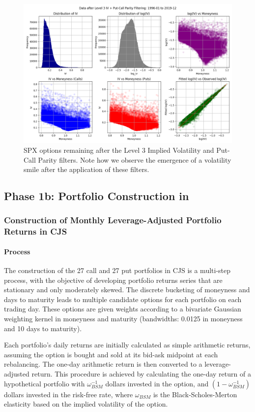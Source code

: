 \documentclass[11pt]{article}
\begin{document}
\begin{figure}[H]
  \centering
  \includegraphics[width=\linewidth,height=0.666\linewidth]{../docs_src/L3_IV_PCP_1996-01_2019-12_iv.png}
  \caption{SPX options remaining after the Level 3 Implied Volatility and Put-Call Parity filters. Note how we observe the emergence of a volatility smile after the application of these filters.}
  \label{fig:l3_iv_pcp_spx_options_data}
\end{figure}


\subsection{Phase 1b: Portfolio Construction in \citet{Constantinides2013}}
\subsubsection{Construction of Monthly Leverage-Adjusted Portfolio Returns in CJS}

\paragraph{Process}
The construction of the 27 call and 27 put portfolios in CJS is a multi-step process, with the objective of developing portfolio returns series that are stationary and only moderately skewed. The discrete bucketing of moneyness and days to maturity leads to multiple candidate options for each portfolio on each trading day. These options are given weights according to a bivariate Gaussian weighting kernel in moneyness and maturity (bandwidths: 0.0125 in moneyness and 10 days to maturity).

Each portfolio's daily returns are initially calculated as simple arithmetic returns, assuming the option is bought and sold at its bid-ask midpoint at each rebalancing. The one-day arithmetic return is then converted to a leverage-adjusted return. This procedure is achieved by calculating the one-day return of a hypothetical portfolio with $\omega_{BSM}^{-1}$ dollars invested in the option, and $(1 - \omega_{BSM}^{-1})$ dollars invested in the risk-free rate, where $\omega_{BSM}$ is the Black-Scholes-Merton elasticity based on the implied volatility of the option.
\end{document}
